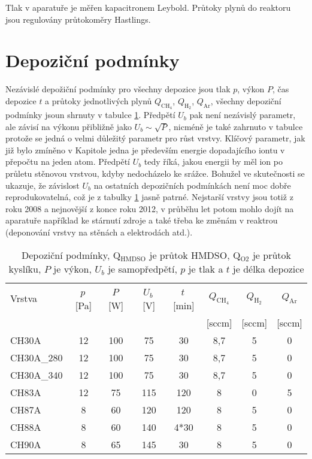 Tlak v aparatuře je měřen kapacitronem Leybold. Průtoky plynů do reaktoru jsou regulovány průtokoměry Hastlings. 

\section{Depoziční podmínky}

Nezávislé depožiční podmínky pro všechny depozice jsou tlak $p$, výkon $P$, čas depozice $t$ a průtoky jednotlivých plynů $Q_{\mathrm{CH_4}}$, $Q_{\mathrm{H_2}}$, $Q_{\mathrm{Ar}}$, všechny depoziční podmínky jsoun shrnuty v tabulce \ref{deppodminky}. Předpětí $U_b$ pak není nezávislý parametr, ale závisí na výkonu přibližně jako $U_b \sim \sqrt{P}$, nicméně je také zahrnuto v tabulce protože se jedná o velmi důležitý parametr pro růst vrstvy. Klíčový parametr, jak již bylo zmíněno v Kapitole jedna je především energie dopadajícího iontu v přepočtu na jeden atom. Předpětí $U_b$ tedy říká, jakou energii by měl ion po průletu stěnovou vrstvou, kdyby nedocházelo ke srážce. Bohužel ve skutečnosti se ukazuje, že závislost $U_b$ na ostatních depozičních podmínkách není moc dobře reprodukovatelná, což je z tabulky \ref{deppodminky} jasně patrné. Nejstarší vrstvy jsou totiž z roku 2008 a nejnovější z konce roku 2012, v průběhu let potom mohlo dojít na aparatuře například ke stárnutí zdroje a také třeba ke změnám v reaktrou (deponování vrstvy na stěnách a elektrodách atd.). 

\begin{table}[htbp]
 \centering
 \begin{tabular}{lccccccc}
	\hline
	{Vrstva} & {$p$\,[Pa]} & {$P$\,[W]} & {$U_b$\,[V]} & {$t$\,[min]} & {$Q_{\mathrm{CH_4}}$} & {$Q_\mathrm{H_2}$} & {$Q_\mathrm{Ar}$} \\
	& & & & & {[sccm]} & {[sccm]} & {[sccm]} \\
	\hline\hline
	CH30A     & 12 & 100 & 75  & 30   & 8,7 & 5 & 0 \\
	CH30A\_280 & 12 & 100 & 75  & 30   & 8,7 & 5 & 0 \\
	CH30A\_340 & 12 & 100 & 75  & 30   & 8,7 & 5 & 0 \\
	CH83A     & 12 & 75  & 115 & 120  & 8   & 0 & 5 \\
	CH87A     & 8  & 60  & 120 & 120  & 8   & 5 & 0 \\
	CH88A     & 8  & 60  & 140 & 4*30 & 8   & 5 & 0	\\
	CH90A     & 8  & 65  & 145 & 30   & 8   & 5 & 0 \\
	\hline
 \end{tabular}
 \caption{Depoziční podmínky, Q$_\mathrm{{HMDSO}}$ je průtok HMDSO, Q$_\mathrm{O2}$ je průtok kyslíku, $P$ je výkon, $U_b$ je samopředpětí, $p$ je tlak a $t$ je délka depozice}
\label{deppodminky}
\end{table}

